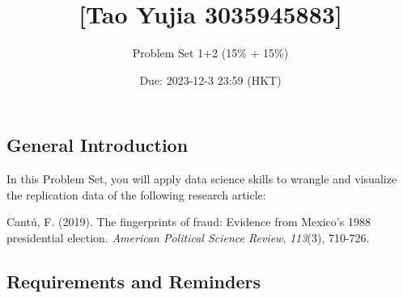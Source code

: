 \documentclass[
]{article}
\title{{[}Tao Yujia 3035945883{]}}
\subtitle{Problem Set 1+2 (15\% + 15\%)}
\author{}
\date{\vspace{-2.5em}Due: 2023-12-3 23:59 (HKT)}
\begin{document}
\maketitle

\hypertarget{general-introduction}{%
\subsection{General Introduction}\label{general-introduction}}

In this Problem Set, you will apply data science skills to wrangle and
visualize the replication data of the following research article:

Cantú, F. (2019). The fingerprints of fraud: Evidence from Mexico's 1988
presidential election. \emph{American Political Science Review},
\emph{113}(3), 710-726.

\hypertarget{requirements-and-reminders}{%
\subsection{Requirements and
Reminders}\label{requirements-and-reminders}}
\end{document}
